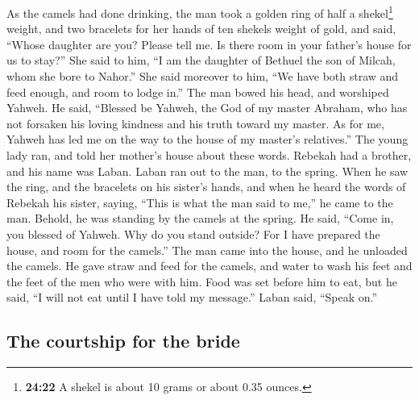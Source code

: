 \begin{paracol}{2}
\begin{otherlanguage}{english}
 As the camels had done drinking, the man took a golden
ring of half a shekel\footnote{\textbf{24:22} A shekel is about 10 grams
  or about 0.35 ounces.} weight, and two bracelets for her hands of ten
shekels weight of gold,  and said, ``Whose daughter are
you? Please tell me. Is there room in your father's house for us to
stay?''  She said to him, ``I am the daughter of Bethuel
the son of Milcah, whom she bore to Nahor.''  She said
moreover to him, ``We have both straw and feed enough, and room to lodge
in.''  The man bowed his head, and worshiped Yahweh.
 He said, ``Blessed be Yahweh, the God of my master
Abraham, who has not forsaken his loving kindness and his truth toward
my master. As for me, Yahweh has led me on the way to the house of my
master's relatives.''  The young lady ran, and told her
mother's house about these words.  Rebekah had a brother,
and his name was Laban. Laban ran out to the man, to the spring.
 When he saw the ring, and the bracelets on his sister's
hands, and when he heard the words of Rebekah his sister, saying, ``This
is what the man said to me,'' he came to the man. Behold, he was
standing by the camels at the spring.  He said, ``Come
in, you blessed of Yahweh. Why do you stand outside? For I have prepared
the house, and room for the camels.''  The man came into
the house, and he unloaded the camels. He gave straw and feed for the
camels, and water to wash his feet and the feet of the men who were with
him.  Food was set before him to eat, but he said, ``I
will not eat until I have told my message.'' Laban said, ``Speak on.''

\hypertarget{the-courtship-for-the-bride}{%
\subsection{The courtship for the
bride}\label{the-courtship-for-the-bride}}


\end{otherlanguage}
\end{paracol}

